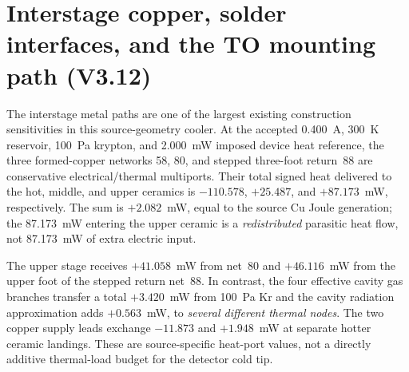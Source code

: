 \clearpage
\section{Interstage copper, solder interfaces, and the TO mounting path (V3.12)}
\label{sec:v312-contact-mount}
The interstage metal paths are one of the largest existing construction sensitivities in this source-geometry cooler. At the accepted 0.400~A, 300~K reservoir, 100~Pa krypton, and 2.000~mW imposed device heat reference, the three formed-copper networks 58, 80, and stepped three-foot return~88 are conservative electrical/thermal multiports. Their total signed heat delivered to the hot, middle, and upper ceramics is \(-110.578\), \(+25.487\), and \(+87.173\)~mW, respectively. The sum is \(+2.082\)~mW, equal to the source Cu Joule generation; the 87.173~mW entering the upper ceramic is a \emph{redistributed} parasitic heat flow, not 87.173~mW of extra electric input.


The upper stage receives \(+41.058\)~mW from net~80 and \(+46.116\)~mW from the upper foot of the stepped return net~88. In contrast, the four effective cavity gas branches transfer a total \(+3.420\)~mW from 100~Pa Kr and the cavity radiation approximation adds \(+0.563\)~mW, to \emph{several different thermal nodes}. The two copper supply leads exchange \(-11.873\) and \(+1.948\)~mW at separate hotter ceramic landings. These are source-specific heat-port values, not a directly additive thermal-load budget for the detector cold tip.

